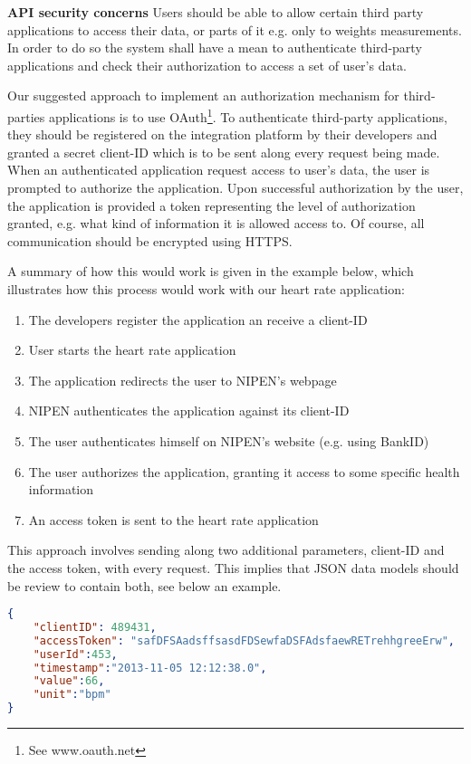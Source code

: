 \textbf{API security concerns}\newline
Users should be able to allow certain third party applications to access
their data, or parts of it e.g. only to weights measurements.
In order to do so the system shall have a mean to authenticate third-party applications
and check their authorization to access a set of user's data.

Our suggested approach to implement an authorization mechanism for third-parties
applications is to use OAuth\footnote{See www.oauth.net}.
To authenticate third-party applications, they should be registered on the integration
platform by their developers and granted a secret client-ID which is to be sent along every
request being made. When an authenticated application request access to user's data, the user
is prompted to authorize the application. Upon successful authorization by the user, the application
is provided a token representing the level of authorization granted, e.g. what kind of information
it is allowed access to. Of course, all communication should be encrypted using HTTPS.

A summary of how this would work is given in the example below, which illustrates how this
process would work with our heart rate application:

\begin{enumerate}[1.]
\item The developers register the application an receive a client-ID
\item User starts the heart rate application
\item The application redirects the user to NIPEN's webpage
\item NIPEN authenticates the application against its client-ID
\item The user authenticates himself on NIPEN's website (e.g. using BankID)
\item The user authorizes the application, granting it access to some specific health information
\item An access token is sent to the heart rate application
\end{enumerate}

This approach involves sending along two additional parameters, client-ID and the access token,
with every request. This implies that JSON data models should be review to contain both,
see below an example.

\begin{lstlisting}[language=json]
{
	"clientID": 489431,
	"accessToken": "safDFSAadsffsasdFDSewfaDSFAdsfaewRETrehhgreeErw",
	"userId":453,
	"timestamp":"2013-11-05 12:12:38.0",
	"value":66,
	"unit":"bpm"
}
\end{lstlisting}


